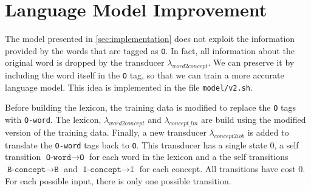 \section{Language Model Improvement}
\label{sec:improvements}

The model presented in \cref{sec:implementation} does not exploit the information provided by the words that are tagged as \texttt{O}.
In fact, all information about the original word is dropped by the transducer $\lambda_{word2concept}$.
We can preserve it by including the word itself in the \texttt{O} tag, so that we can train a more accurate language model.
This idea is implemented in the file \texttt{model/v2.sh}.

Before building the lexicon, the training data is modified to replace the \texttt{O} tags with \texttt{O-word}.
The lexicon, $\lambda_{word2concept}$ and $\lambda_{concept\_lm}$ are build using the modified version of the training data.
Finally, a new transducer $\lambda_{concept2iob}$ is added to translate the \texttt{O-word} tags back to \texttt{O}.
This transducer has a single state $0$, a self transition $\texttt{O-word} \rightarrow \texttt{O}$ for each word in the lexicon and a the self transitions $\texttt{B-concept} \rightarrow \texttt{B}$ and $\texttt{I-concept} \rightarrow \texttt{I}$ for each concept.
All transitions have cost $0$.
For each possible input, there is only one possible transition.
